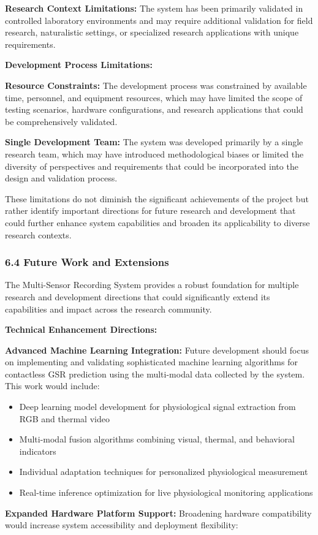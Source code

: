 \documentclass[12pt,a4paper]{report}
\begin{document}
\textbf{Research Context Limitations:}
The system has been primarily validated in controlled laboratory environments and may require additional validation for
field research, naturalistic settings, or specialized research applications with unique requirements.

\textbf{Development Process Limitations:}

\textbf{Resource Constraints:}
The development process was constrained by available time, personnel, and equipment resources, which may have limited
the scope of testing scenarios, hardware configurations, and research applications that could be comprehensively
validated.

\textbf{Single Development Team:}
The system was developed primarily by a single research team, which may have introduced methodological biases or limited
the diversity of perspectives and requirements that could be incorporated into the design and validation process.

These limitations do not diminish the significant achievements of the project but rather identify important directions
for future research and development that could further enhance system capabilities and broaden its applicability to
diverse research contexts.

\subsubsection{6.4 Future Work and Extensions}

The Multi-Sensor Recording System provides a robust foundation for multiple research and development directions that
could significantly extend its capabilities and impact across the research community.

\textbf{Technical Enhancement Directions:}

\textbf{Advanced Machine Learning Integration:}
Future development should focus on implementing and validating sophisticated machine learning algorithms for contactless
GSR prediction using the multi-modal data collected by the system. This work would include:

\begin{itemize}
\item Deep learning model development for physiological signal extraction from RGB and thermal video
\item Multi-modal fusion algorithms combining visual, thermal, and behavioral indicators
\item Individual adaptation techniques for personalized physiological measurement
\item Real-time inference optimization for live physiological monitoring applications

\end{itemize}
\textbf{Expanded Hardware Platform Support:}
Broadening hardware compatibility would increase system accessibility and deployment flexibility:
\end{document}
